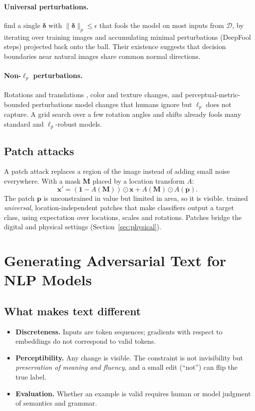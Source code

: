 \documentclass[10pt,a4paper]{extarticle}
\theoremstyle{definition}
\newcommand{\D}{\mathcal{D}}
\newcommand{\x}{\mathbf{x}}
\newcommand{\xadv}{\mathbf{x}'}
\newcommand{\bdelta}{\boldsymbol{\delta}}
\begin{document}
\paragraph{Universal perturbations.} \citet{moosavi2017universal} find a single \(\bdelta\) with \(\|\bdelta\|_p\le\epsilon\) that fools the model on most inputs from \(\D\), by iterating over training images and accumulating minimal perturbations (DeepFool steps) projected back onto the ball. Their existence suggests that decision boundaries near natural images share common normal directions.

\paragraph{Non-\(\ell_p\) perturbations.} Rotations and translations \citep{engstrom2019spatial}, color and texture changes, and perceptual-metric-bounded perturbations \citep{laidlaw2021perceptual} model changes that humans ignore but \(\ell_p\) does not capture. A grid search over a few rotation angles and shifts already fools many standard and \(\ell_p\)-robust models.

\subsection{Patch attacks}

A patch attack replaces a region of the image instead of adding small noise everywhere. With a mask \(\mathbf{M}\) placed by a location transform \(A\):
\[
\xadv=(\mathbf{1}-A(\mathbf{M}))\odot\x+A(\mathbf{M})\odot A(\mathbf{p}).
\]
The patch \(\mathbf{p}\) is unconstrained in value but limited in area, so it is visible. \citet{brown2017patch} trained \emph{universal}, location-independent patches that make classifiers output a target class, using expectation over locations, scales and rotations. Patches bridge the digital and physical settings (Section~\ref{sec:physical}).

\section{Generating Adversarial Text for NLP Models}

\subsection{What makes text different}

\begin{itemize}
  \item \textbf{Discreteness.} Inputs are token sequences; gradients with respect to embeddings do not correspond to valid tokens.
  \item \textbf{Perceptibility.} Any change is visible. The constraint is not invisibility but \emph{preservation of meaning and fluency}, and a small edit (\enquote{not}) can flip the true label.
  \item \textbf{Evaluation.} Whether an example is valid requires human or model judgment of semantics and grammar.
\end{itemize}
\end{document}
